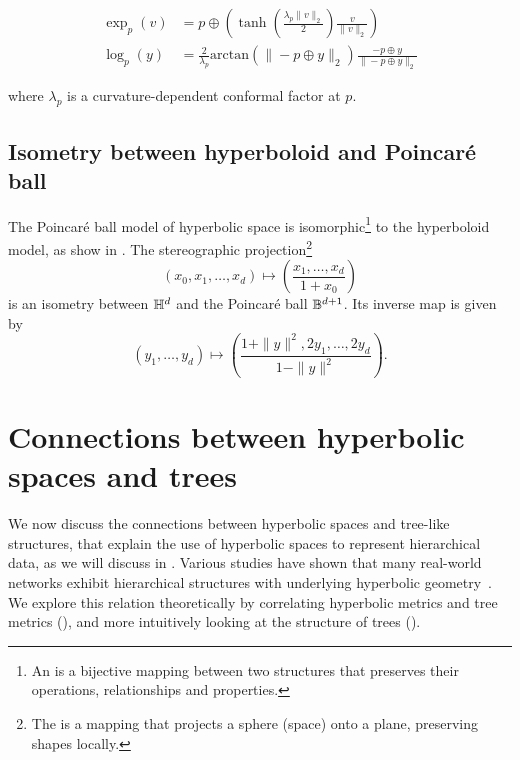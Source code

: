 \begin{align}
    \exp_p(v) &= p \oplus \left(\tanh\left(\frac{\lambda_p\|v\|_2}{2}\right)\frac{v}{\|v\|_2}\right) \label{eq:exp_poincareBall} \\
    \log_p(y) &= \frac{2}{\lambda_p}\text{arctan}(\|-p \oplus y\|_2)\frac{-p \oplus y}{\|-p \oplus y\|_2} \label{eq:log_poincareBall}
\end{align}

where $\lambda_p$ is a curvature-dependent conformal factor at $p$.



\subsection{Isometry between hyperboloid and Poincaré ball}\label{sec:isometry}
The Poincaré ball model of hyperbolic space is isomorphic\footnote{An  is a bijective mapping between two structures that preserves their operations, relationships and properties.} to the hyperboloid model, as show in . The stereographic projection\footnote{The  is a mapping that projects a sphere (space) onto a plane, preserving shapes locally.}
\begin{equation}\label{eq:stereographicProjection}
    (x_0, x_1, \ldots, x_d) \mapsto \left(\frac{x_1, \ldots, {x_d}}{1+x_0}\right)
\end{equation}
is an isometry between $\mathbb{H}^{d}$ and the Poincaré ball $\mathbb{B}^{d+1}$. Its inverse map is given by
\begin{equation}\label{eq:inverseStereographicProjection}
    (y_1, \ldots, y_d) \mapsto \left(\frac{1 + \|y\|^2, 2y_1, \ldots, 2y_d}{1 - \|y\|^2}\right).
\end{equation}

\section{Connections between hyperbolic spaces and trees}\label{sec:hyperbolicAndTrees}
We now discuss the connections between hyperbolic spaces and tree-like structures, that explain the use of hyperbolic spaces to represent hierarchical data, as we will discuss in . Various studies have shown that many real-world networks exhibit hierarchical structures with underlying hyperbolic geometry~\cite{Krioukov2010HyperbolicGeometryComplexNetworks}\cite{Papadopoulos2012popularityVSSimilarityGrowingNetworks}. We explore this relation theoretically by correlating hyperbolic metrics and tree metrics (), and more intuitively looking at the structure of trees ().


